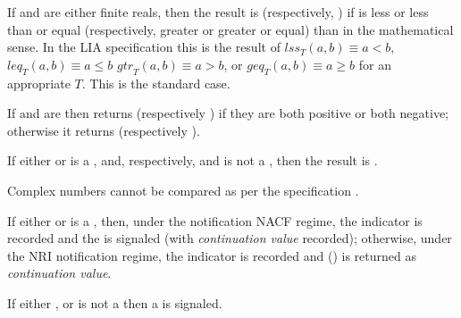 \documentclass[../Comparisons-Predicates.tex]{subfiles}
\begin{document}
\begin{description}
\item If  and  are either finite reals, then the result is
   (respectively, ) if  is
  less or less than or equal (respectively, greater or greater or equal)
  than  in the mathematical sense.  In the
  LIA specification this is the result of
  $\mathit{lss}_T(a, b) \equiv a < b$,
  $\mathit{leq}_T(a, b) \equiv a \leq b$
  $\mathit{gtr}_T(a, b) \equiv a > b$, or
  $\mathit{geq}_T(a, b) \equiv a \geq b$
  for an
  appropriate $T$.  This is the standard \CL{} case.
  
\item If  and  are  then
  \code{=} returns  (respectively ) if they
  are both positive or both negative; otherwise it returns
   (respectively ).
  
\item If either  or  is a ,
  and, respectively,  and  is not a
  , then the result is .
  
\item Complex numbers cannot be compared as per the \CL{}
  specification \cite{1996:ANSIHyperSpec}.
\end{description}

\DExceptional{}

If either  or  is a , then, under the notification NACF regime, the indicator
 is recorded and the
 is signaled (with
\emph{continuation value}  recorded); otherwise, under the
NRI notification regime, the indicator  is recorded and
 () is returned as \emph{continuation value}.

If either , or  is not a  then a
 is signaled.
\end{document}
